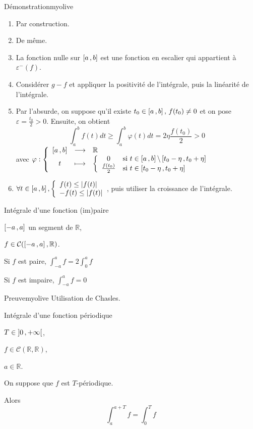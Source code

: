     \begin{demo}{Démonstration}{myolive}
        \begin{enumerate}
            \item Par construction.
            \item De même.
            \item La fonction nulle sur $\left[ a \, , b \right]$ est une fonction en escalier qui appartient à $\varepsilon^- (f)$.
            \item Considérer $g-f$ et appliquer la positivité de l’intégrale, puis la linéarité de l’intégrale.
            \item Par l’absurde, on suppose qu’il existe $t_0 \in \left[ a \, , b \right], \, f(t_0) \neq 0$ et on pose $\varepsilon = \frac{t_0}{2} > 0$. Ensuite, on obtient  
            \[ \int_{a}^{b} f(t)dt \geq \int_{a}^{b} \varphi(t)dt = 2 \eta \frac{f(t_0)}{2} > 0 \] 
            avec $ \fonction{\varphi}{\intervalleFF{a}{b}}{\mathbb{R}}{t}{\sisi{0}{t \in \intervalleFF{a}{b} \backslash \intervalleFF{t_0 - \eta}{t_0 + \eta}}{\frac{f(t_0)}{2}}{t \in \intervalleFF{t_0-\eta}{t_0+\eta}}} $
            \item $\forall t \in \intervalleFF{a}{b}, \et{f(t) \leq \abs{f(t)}}{-f(t) \leq \abs{f(t)}}$, puis utiliser la croissance de l’intégrale.
        \end{enumerate}
    \end{demo}

    \begin{prop}{Intégrale d’une fonction (im)paire}{}
        \begin{soient}
            \item $\left[ -a \, , a \right]$ un segment de $\mathbb{R}$,
            \item $f \in \mathcal{C}(\left[ -a \, , a \right],\mathbb{R})$.
        \end{soient}
        \begin{alors}
            \item Si $f$ est paire, $\int_{-a}^{a}f = 2 \int_{0}^{a}f$
            \item Si $f$ est impaire, $\int_{-a}^{a}f = 0$
        \end{alors}
    \end{prop}

    \begin{demo}{Preuve}{myolive}
        Utilisation de Chasles.
    \end{demo}

    \begin{prop}{Intégrale d’une fonction périodique}{}
        \begin{soient}
            \item $T \in \left] 0 \, , +\infty \right[$,
            \item $f \in \mathcal{C}(\mathbb{R},\mathbb{R})$,
            \item $a \in \mathbb{R}$.
        \end{soient}
        On suppose que $f$ est $T$-périodique. 

        Alors 
        \[ \int_{a}^{a+T}f = \int_{0}^{T}f \]
    \end{prop}

